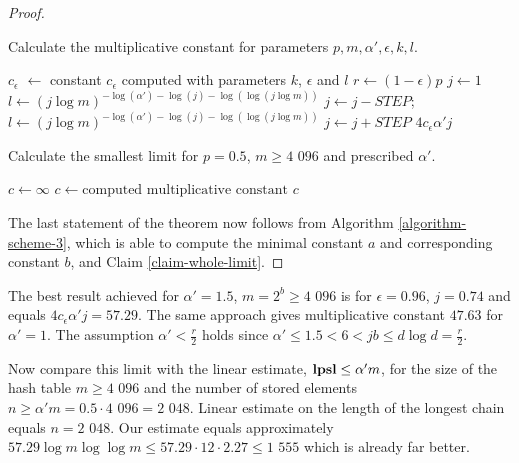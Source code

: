 \begin{proof}
\begin{algorithm}[H]
\caption{Calculate the multiplicative constant for parameters $p, m, \alpha', \epsilon, k, l$.}
\label{procedure-scheme-3}
\begin{algorithmic}
\STATE $c_\epsilon$ $\leftarrow$ constant $c_\epsilon$ computed with parameters $k$, $\epsilon$ and $l$
\STATE $r \leftarrow (1 - \epsilon)p$ 
\STATE $j \leftarrow 1$
\STATE 
\STATE {}
\STATE $l \leftarrow (j \log m) ^ {-\log(\alpha') - \log(j) - \log(\log(j \log m))}$
	\STATE $j \leftarrow j - STEP$;
	\STATE $l \leftarrow (j \log m) ^ {-\log(\alpha') - \log(j) - \log(\log(j \log m))}$
\ENDWHILE
\STATE
\STATE $j \leftarrow j + STEP$
\RETURN $4 c_\epsilon \alpha' j$
\end{algorithmic}
\end{algorithm}

\begin{algorithm}[H]
\caption{Calculate the smallest limit for $p=0.5$, $m \geq \text{4 096}$ and prescribed $\alpha'$.}
\label{algorithm-scheme-3}
\begin{algorithmic}
\STATE $c \leftarrow \infty$
				\STATE $c \leftarrow \text{computed multiplicative constant}$
			\ENDIF
		\ENDFOR
	\ENDFOR
\ENDFOR
\STATE
\RETURN $c$
\end{algorithmic}
\end{algorithm}

The last statement of the theorem now follows from Algorithm \ref{algorithm-scheme-3}, which is able to compute the minimal constant $a$ and corresponding constant $b$, and Claim \ref{claim-whole-limit}.
\end{proof}

The best result achieved for $\alpha' = 1.5$, $m = 2 ^ b \geq \text{4 096}$ is for $\epsilon = 0.96$, $j = 0.74$ and equals $4 c_\epsilon \alpha' j = 57.29$. The same approach gives multiplicative constant $47.63$ for $\alpha' = 1$. The assumption $\alpha' < \frac{r}{2}$ holds since $\alpha' \leq 1.5 < 6 < jb \leq d \log d = \frac{r}{2}$.

Now compare this limit with the linear estimate, $\mathbf{lpsl} \leq \alpha' m$, for the size of the hash table $m \geq \text{4 096}$ and the number of stored elements $n \geq \alpha' m = 0.5 \cdot \text{4 096} = \text{2 048}$. Linear estimate on the length of the longest chain equals $n = \text{2 048}$. Our estimate equals approximately $57.29 \log m \log \log m \leq 57.29 \cdot 12 \cdot 2.27 \leq \text{1 555}$ which is already far better. 

